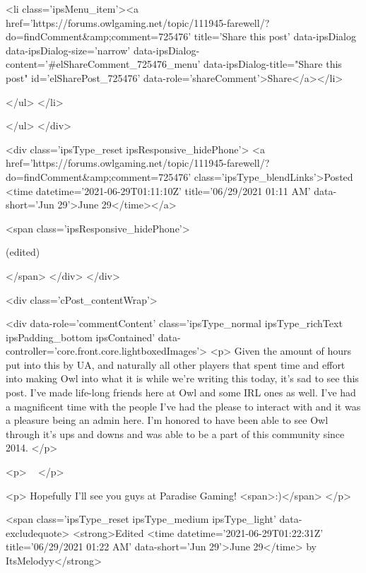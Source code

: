 						
							<li class='ipsMenu_item'><a href='https://forums.owlgaming.net/topic/111945-farewell/?do=findComment&amp;comment=725476' title='Share this post' data-ipsDialog data-ipsDialog-size='narrow' data-ipsDialog-content='#elShareComment_725476_menu' data-ipsDialog-title="Share this post" id='elSharePost_725476' data-role='shareComment'>Share</a></li>
						
                        
						
						
						
							
								
							
							
							
							
							
							
						
					</ul>
				</li>
				
			</ul>
		</div>

		<div class='ipsType_reset ipsResponsive_hidePhone'>
			<a href='https://forums.owlgaming.net/topic/111945-farewell/?do=findComment&amp;comment=725476' class='ipsType_blendLinks'>Posted <time datetime='2021-06-29T01:11:10Z' title='06/29/2021 01:11  AM' data-short='Jun 29'>June 29</time></a> 
			
			<span class='ipsResponsive_hidePhone'>
				
					(edited)
				
				
			</span>
		</div>
	</div>

	

    

	<div class='cPost_contentWrap'>
		
		<div data-role='commentContent' class='ipsType_normal ipsType_richText ipsPadding_bottom ipsContained' data-controller='core.front.core.lightboxedImages'>
			<p>
	Given the amount of hours put into this by UA, and naturally all other players that spent time and effort into making Owl into what it is while we're writing this today, it's sad to see this post. I've made life-long friends here at Owl and some IRL ones as well. I've had a magnificent time with the people I've had the please to interact with and it was a pleasure being an admin here. I'm honored to have been able to see Owl through it's ups and downs and was able to be a part of this community since 2014.
</p>

<p>
	 
</p>

<p>
	Hopefully I'll see you guys at Paradise Gaming! <span>:)</span>
</p>


			
				

<span class='ipsType_reset ipsType_medium ipsType_light' data-excludequote>
	<strong>Edited <time datetime='2021-06-29T01:22:31Z' title='06/29/2021 01:22  AM' data-short='Jun 29'>June 29</time> by ItsMelodyy</strong>
	
